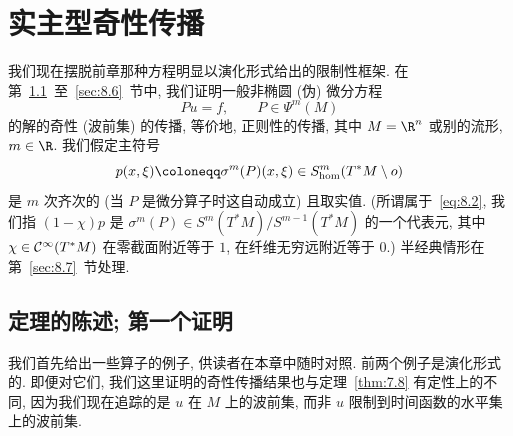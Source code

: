 


\chapter[实主型奇性传播]{实主型奇性传播}\label{ch:08}
%
%

我们现在摆脱前章那种方程明显以演化形式给出的限制性框架. 在第~\ref{sec:8.1}~至~\ref{sec:8.6}~节中, 我们证明一般非椭圆 (伪) 微分方程
\begin{equation}\label{eq:8.1}
    Pu = f, \qquad P \in \Psi^m(M)
\end{equation}
的解的奇性 (波前集) 的传播, 等价地, 正则性的传播, 其中 $M = \R^n$ 或别的流形, $m \in \R$. 我们假定主符号
\begin{equation}\label{eq:8.2}
    p(x, \xi) \defeq \sigma^m(P)(x, \xi) \in S^m_{\mathrm{hom}}(T^*M \setminus o)
\end{equation}
是 $m$ 次齐次的 (当 $P$ 是微分算子时这自动成立) 且取实值. (所谓属于~\eqref{eq:8.2}, 我们指 $(1 - \chi)p$ 是 $\sigma^m(P) \in S^m(T^*M)/S^{m-1}(T^*M)$ 的一个代表元, 其中 $\chi \in \mathcal{C}^\infty(T^*M)$ 在零截面附近等于 $1$, 在纤维无穷远附近等于 $0$.) 半经典情形在第~\ref{sec:8.7}~节处理.

\section{定理的陈述; 第一个证明}\label{sec:8.1}

我们首先给出一些算子的例子, 供读者在本章中随时对照. 前两个例子是演化形式的. 即便对它们, 我们这里证明的奇性传播结果也与定理~\ref{thm:7.8} 有定性上的不同, 因为我们现在追踪的是 $u$ 在 $M$ 上的波前集, 而非 $u$ 限制到时间函数的水平集上的波前集.

